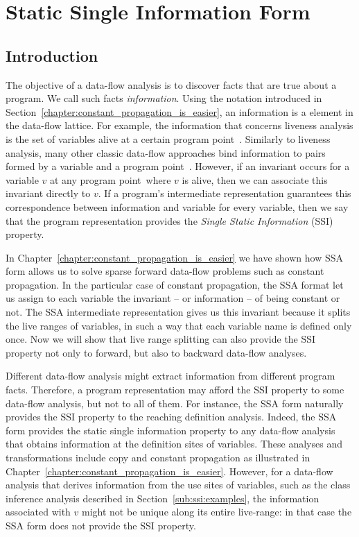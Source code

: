 \def\progpoint{program point\ }
\def\progpoints{program points\ }
\def\splitpoint{control-flow point\ }
\def\splitpoints{control-flow points\ }
\chapter{Static Single Information Form }
\label{chapter:ssi}


\section{Introduction}
\label{sec:ssi:pereira:intro}

The objective of a data-flow analysis is to discover facts that are true about a
program.
We call such facts {\em information}.
Using the notation introduced in Section~\ref{chapter:constant_propagation_is_easier}, an
information is a element in the data-flow lattice.
For example, the information that concerns liveness analysis is the set of
variables alive at a certain \progpoint.
Similarly to liveness analysis, many other classic data-flow approaches bind
information to pairs formed by a variable and a \progpoint.
However, if an invariant occurs for a variable $v$ at any \progpoint where
$v$ is alive, then we can associate this invariant directly to $v$.
If a program's intermediate representation guarantees this correspondence between
information and variable for every variable, then we say that the program
representation provides the {\em Single Static Information} (SSI) property.

In Chapter~\ref{chapter:constant_propagation_is_easier} we have shown how SSA form allows us to solve sparse forward data-flow problems such as constant propagation.
In the particular case of constant propagation, the SSA format let us assign to each variable the invariant -- or information -- of being constant or not.
The SSA intermediate representation gives us this invariant because it splits the live ranges of variables, in such a way that each variable name is defined only once.
Now we will show that live range splitting can also provide the SSI property not only to forward, but also to backward data-flow analyses.

Different data-flow analysis might extract information from different program
facts.
Therefore, a program representation may afford the SSI property to some data-flow
analysis, but not to all of them.
For instance, the SSA form naturally provides the SSI property to the reaching
definition analysis.
Indeed, the SSA form provides the static single information property to any
data-flow analysis that obtains information at the definition sites of
variables.
These analyses and transformations include copy and constant propagation as illustrated in Chapter~\ref{chapter:constant_propagation_is_easier}.
However, for a data-flow analysis that derives information from the use sites of variables, such as the class inference analysis described in Section~\ref{sub:ssi:examples}, the information associated with $v$ might not be unique along its entire live-range: in that case the SSA form does not provide the SSI property.

